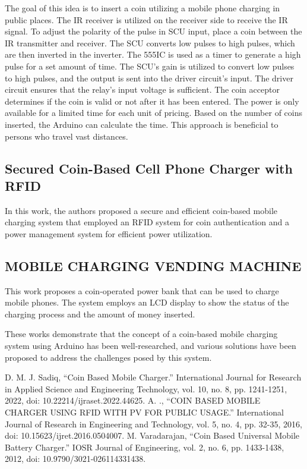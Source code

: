 \documentclass[conference]{IEEEtran}
\begin{document}
The goal of this idea is to insert a coin utilizing a mobile phone charging in public places. The IR receiver is utilized on the receiver side to receive the IR signal. To adjust the polarity of the pulse in SCU input, place a coin between the IR transmitter and receiver. The SCU converts low pulses to high pulses, which are then inverted in the inverter. The 555IC is used as a timer to generate a high pulse for a set amount of time. The SCU's gain is utilized to convert low pulses to high pulses, and the output is sent into the driver circuit's input. The driver circuit ensures that the relay's input voltage is sufficient. The coin acceptor determines if the coin is valid or not after it has been entered. The power is only available for a limited time for each unit of pricing. Based on the number of coins inserted, the Arduino can calculate the time. This approach is beneficial to persons who travel vast distances.


\subsection{Secured Coin-Based Cell Phone Charger with RFID}
In this work, the authors proposed a secure and efficient coin-based mobile charging system that employed an RFID system for coin authentication and a power management system for efficient power utilization.

\subsection{MOBILE CHARGING VENDING MACHINE}
This work proposes a coin-operated power bank that can be used to charge mobile phones. The system employs an LCD display to show the status of the charging process and the amount of money inserted.

These works demonstrate that the concept of a coin-based mobile charging system using Arduino has been well-researched, and various solutions have been proposed to address the challenges posed by this system.



\begin{thebibliography}{00}
D. M. J. Sadiq, “Coin Based Mobile Charger.” International Journal for Research in Applied Science and Engineering Technology, vol. 10, no. 8, pp. 1241-1251, 2022, doi: 10.22214/ijraset.2022.44625.
A. ., “COIN BASED MOBILE CHARGER USING RFID WITH PV FOR PUBLIC USAGE.” International Journal of Research in Engineering and Technology, vol. 5, no. 4, pp. 32-35, 2016, doi: 10.15623/ijret.2016.0504007.
 M. Varadarajan, “Coin Based Universal Mobile Battery Charger.” IOSR Journal of Engineering, vol. 2, no. 6, pp. 1433-1438, 2012, doi: 10.9790/3021-026114331438.

\end{thebibliography}
\end{document}
